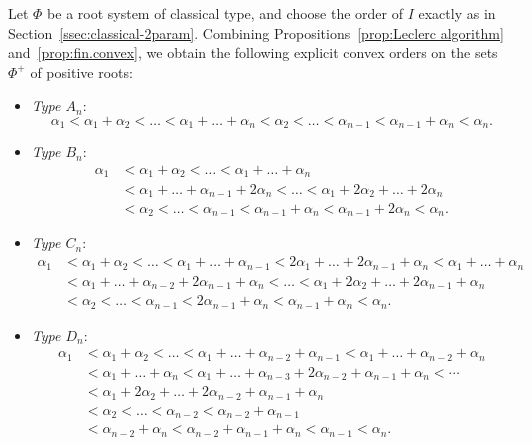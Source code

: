 \documentclass[pdftex]{sigma}
\numberwithin{equation}{section}
\begin{document}
Let $\Phi$ be a root system of classical type, and choose the order of $I$ exactly as in Section~\ref{ssec:classical-2param}. Combining Propositions~\ref{prop:Leclerc algorithm} and~\ref{prop:fin.convex}, we obtain the following explicit convex orders on the sets~$\Phi^+$ of positive roots:
\begin{itemize}\itemsep=0pt
\item
\emph{Type $A_{n}$}:
\begin{equation}\label{eq:A_order}
 \alpha_{1} < \alpha_{1} + \alpha_{2} < \dots < \alpha_{1} + \dots + \alpha_{n} < \alpha_{2} <
 \dots < \alpha_{n-1} < \alpha_{n-1} + \alpha_{n} < \alpha_{n}.
\end{equation}

\item
\emph{Type $B_{n}$}:
\begin{align}
\alpha_{1} &{}< \alpha_{1} + \alpha_{2} < \dots < \alpha_{1} + \dots + \alpha_{n}\nonumber \\
 & {} < \alpha_{1} + \dots + \alpha_{n-1} + 2\alpha_{n} < \dots
 <\alpha_{1} + 2\alpha_{2} + \dots + 2\alpha_{n} \nonumber \\
 &{}<\alpha_{2} < \dots < \alpha_{n-1} < \alpha_{n-1} + \alpha_{n} < \alpha_{n-1} + 2\alpha_{n} < \alpha_{n}.\label{eq:B_order}
\end{align}

\item
\emph{Type $C_{n}$}:
\begin{align}
 \alpha_{1} &{}< \alpha_{1} + \alpha_{2} < \dots < \alpha_{1} + \dots + \alpha_{n-1} <
 2\alpha_{1} + \dots + 2\alpha_{n-1} + \alpha_{n} < \alpha_{1} + \dots + \alpha_{n} \nonumber\\
 &{}< \alpha_{1} + \dots + \alpha_{n-2} + 2\alpha_{n-1} + \alpha_{n} < \dots <
 \alpha_{1} + 2\alpha_{2} + \dots + 2\alpha_{n-1} + \alpha_{n} \nonumber\\
 &{}<\alpha_{2} < \dots < \alpha_{n-1} < 2\alpha_{n-1} + \alpha_{n} < \alpha_{n-1} + \alpha_{n} < \alpha_{n}.\label{eq:C_order}
\end{align}

\item
\emph{Type $D_{n}$}:
\begin{align}
 \alpha_{1} & < \alpha_{1} + \alpha_{2} < \dots < \alpha_{1} + \dots + \alpha_{n-2}+\alpha_{n-1} <
 \alpha_{1} +\dots + \alpha_{n-2} + \alpha_{n} \nonumber\\
 & < \alpha_{1} + \dots + \alpha_{n}< \alpha_{1} + \dots + \alpha_{n-3} + 2\alpha_{n-2} + \alpha_{n-1} + \alpha_{n} < \cdots\nonumber \\
 & < \alpha_{1} + 2\alpha_{2} + \dots + 2\alpha_{n-2} + \alpha_{n-1} + \alpha_{n} \nonumber\\
 &
 < \alpha_{2} < \dots < \alpha_{n-2}<\alpha_{n-2}+\alpha_{n-1}\nonumber\\
 & <\alpha_{n-2}+\alpha_{n}< \alpha_{n-2} + \alpha_{n-1} + \alpha_{n} <\alpha_{n-1}<\alpha_{n}.\label{eq:D_order}
\end{align}
\end{itemize}
\end{document}
